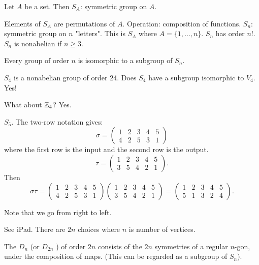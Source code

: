 \documentclass[class=article,crop=false]{standalone}
\begin{document}
\begin{note}
	Let $ A$ be a set. Then  $ S_A$: symmetric group on  $ A$. 

	Elements of  $ S_A$ are permutations of  $ A$. Operation: composition of functions.  $ S_n$: symmetric group on  $ n$ "letters". This is  $ S_A$ where  $ A=\{1,\ldots,n\} $. $ S_n$ has order $ n!$. \\

	$ S_n$ is nonabelian if  $ n \geq 3$.
\end{note}
\begin{thm}[Cayley]
Every group of order $ n$ is  isomorphic to a subgroup of $ S_n$.
\end{thm}

\begin{eg}[]
$ S_4$ is a nonabelian group of order  24. Does $ S_4$ have a subgroup isomorphic to  $ V_4$. Yes!
\end{eg}

\begin{eg}[]
What about $ \mathbb{Z}_4$? Yes.
\end{eg}

\begin{eg}[8.4]
$ S_5$. The two-row notation gives:
 \[
	 \sigma = \begin{pmatrix} 1&2&3&4&5\\4&2&5&3&1 \end{pmatrix} 
\] 
where the first row is the input and the second row is the output. 
\[
	\tau = \begin{pmatrix} 1&2&3&4&5\\3&5&4&2&1 \end{pmatrix} 
.\]
Then
\[
	\sigma \tau = \begin{pmatrix} 1&2&3&4&5\\4&2&5&3&1 \end{pmatrix}  \begin{pmatrix} 1&2&3&4&5\\3&5&4&2&1 \end{pmatrix} = \begin{pmatrix} 1&2&3&4&5\\5&1&3&2&4 \end{pmatrix} 
.\]

Note that we go from right to left.
\end{eg}

See iPad. There are $ 2n$ choices where  $ n$ is number of vertices.

\begin{defn}
	The  $ D_n$ (or $ D_{2n}$ ) of order $ 2n$ consists of the $ 2n$ symmetries of a regular  $ n$-gon, under the composition of maps. (This can be regarded as a subgroup of  $ S_n$).
\end{defn}
\end{document}
